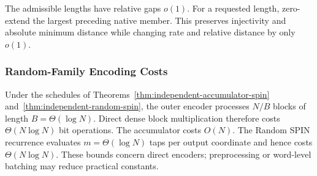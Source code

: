 The admissible lengths have relative gaps $o(1)$. For a requested length,
zero-extend the largest preceding native member. This preserves injectivity and
absolute minimum distance while changing rate and relative distance by only
$o(1)$.

\subsubsection{Random-Family Encoding Costs}

Under the schedules of Theorems~\ref{thm:independent-accumulator-spin}
and~\ref{thm:independent-random-spin}, the outer encoder processes \(N/B\) blocks of
length \(B=\Theta(\log N)\). Direct dense block multiplication therefore
costs \(\Theta(N\log N)\) bit operations. The accumulator costs \(O(N)\).
The Random SPIN recurrence evaluates \(m=\Theta(\log N)\) taps per output
coordinate and hence costs \(\Theta(N\log N)\). These bounds concern direct
encoders; preprocessing or word-level batching may reduce practical constants.
